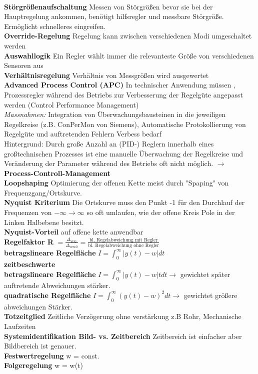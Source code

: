 \documentclass{article}
\begin{document}
\begin{multicols}{6}
\\
\textbf{Störgrößenaufschaltung} Messen von Störgrößen bevor sie bei der Hauptregelung ankommen, benötigt hilfsregler und messbare Störgröße. Ermöglicht schnelleres eingreifen.
\\
\textbf{Override-Regelung} Regelung kann zwischen verschiedenen Modi umgeschaltet werden
\\
\textbf{Auswahllogik} Ein Regler wählt immer die relevanteste Größe von verschiedenen Sensoren aus
\\
\textbf{Verhältnisregelung} Verhältnis von Messgrößen wird ausgewertet
\\
\textbf{Advanced Process Control (APC)} 
In technischer Anwendung müssen ‚ Prozessregler während des Betriebs zur Verbesserung der Regelgüte angepasst werden (Control Performance Management) \\
\textit{Massnahmen:} Integration von Überwachungsbausteinen in die jeweiligen Regelkreise (z.B. ConPerMon von Siemens), Automatische Protokollierung von Regelgüte und auftretenden Fehlern Verbess bedarf \\
Hintergrund: Durch große Anzahl an (PID-) Reglern innerhalb eines großtechnischen Prozesses ist eine manuelle Überwachung der Regelkreise und Veränderung der Parameter während des Betriebs oft nicht möglich. $\rightarrow$ \textbf{Process-Controll-Management}
\\
\textbf{Loopshaping} Optimierung der offenen Kette meist durch "Spaping" von Frequenzgang/Ortskurve.
\\
\textbf{Nyquist Kriterium}
Die Ortskurve muss den Punkt -1 für den Durchlauf der Frequenzen von $-\infty \rightarrow \infty$ so oft umlaufen, wie der offene Kreis Pole in der Linken Halbebene besitzt. \\
\textbf{Nyquist-Vorteil} auf offene kette anwendbar
\\
\textbf{Regelfaktor R} $=\frac{\Delta_{w \infty}}{\Delta_{w \infty 0}}=\frac{\text {bl. Regelabweichung mit Regler}}{\text {bl. Regelabweichung ohne Regler}}$
\\
\textbf{betragslineare Regelfläche} $I=\int_{0}^{\infty}|y(t)-w| d t$
\\
\textbf{zeitbeschwerte \\betragslineare Regelfläche} $I=\int_{0}^{\infty}|y(t)-w|t d t \rightarrow$ gewichtet später auftretende Abweichungen stärker.
\\
\textbf{quadratische Regelfläche} $I=\int_{0}^{\infty}(y(t)-w)^{2} d t \rightarrow$ gewichtet größere abweichungen Stärker.
\\
\textbf{Totzeitglied} Zeitliche Verzögerung ohne verstärkung z.B Rohr, Mechanische Laufzeiten
\\
\textbf{Systemidentifikation Bild- vs. Zeitbereich} Zeitbereich ist einfacher aber Bildbereich ist genauer.
\\
\textbf{Festwertregelung} w = const.
\\
\textbf{Folgeregelung} w = w(t)


\end{multicols}
\end{document}
